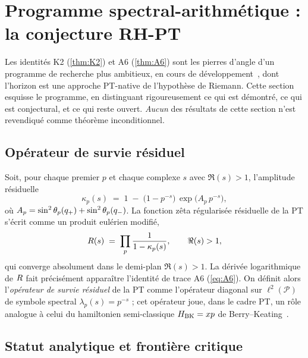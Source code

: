 \section{Programme spectral-arithmétique : la conjecture RH-PT}
\label{sec:programme}

Les identités K2 (\ref{thm:K2}) et A6 (\ref{thm:A6}) sont les pierres d'angle d'un programme de recherche plus ambitieux, en cours de développement~\cite{PT_NewMath_Consolidation}, dont l'horizon est une approche PT-native de l'hypothèse de Riemann. Cette section esquisse le programme, en distinguant rigoureusement ce qui est démontré, ce qui est conjectural, et ce qui reste ouvert. \emph{Aucun} des résultats de cette section n'est revendiqué comme théorème inconditionnel.

\subsection{Opérateur de survie résiduel}
\label{sec:programme:operateur}

Soit, pour chaque premier $p$ et chaque complexe $s$ avec $\Re(s) > 1$, l'amplitude résiduelle
\[
\kappa_p(s) \;=\; 1 \;-\; \bigl(1 - p^{-s}\bigr)\,\exp\!\bigl(A_p\, p^{-s}\bigr),
\]
où $A_p = \sin^{2}\theta_{p}(q_{+}) + \sin^{2}\theta_{p}(q_{-})$. La fonction zêta régularisée résiduelle de la PT s'écrit comme un produit eulérien modifié,
\[
R(s) \;=\; \prod_{p} \dfrac{1}{1 - \kappa_p(s)},
\qquad \Re(s) > 1,
\]
qui converge absolument dans le demi-plan $\Re(s) > 1$. La dérivée logarithmique de $R$ fait précisément apparaître l'identité de trace A6 (\ref{eq:A6}). On définit alors l'\emph{opérateur de survie résiduel} de la PT comme l'opérateur diagonal sur $\ell^{2}(\mathcal P)$ de symbole spectral $\lambda_p(s) = p^{-s}$ ; cet opérateur joue, dans le cadre PT, un rôle analogue à celui du hamiltonien semi-classique $H_{\rm BK} = xp$ de Berry--Keating~\cite{BerryKeating1999}.

\subsection{Statut analytique et frontière critique}
\label{sec:programme:statut}

